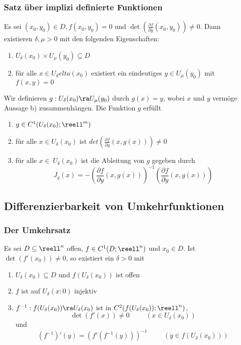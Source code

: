 \documentclass{kit}
\begin{document}
    \subsubsection{Satz über implizi definierte Funktionen}
      Es sei $(x_0,y_0)\in D,f(x_0,y_0)=0$ und $\det(\frac{\partial f}{\partial y}(x_0,y_0))\neq0$. Dann existieren 
      $\delta,\mu>0$ mit den folgenden Eigenschaften:
      \begin{enumerate}
        \item $U_\delta(x_0)\times U_\mu(y_0)\subseteq D$
        \item für alle $x\in U_delta(x_0)$ existiert ein eindeutiges $y\in U_\mu(y_0)$ mit $f(x,y)=0$
      \end{enumerate}
      Wir definieren $g:U_\delta(x_0)\ra U_\mu(y_0)$ durch $g(x)=y$, wobei $x$ und $y$ vermöge Aussage b) zusammenhängen.
      Die Funktion $g$ erfüllt
      \begin{enumerate}
        \item $g\in C^1(U_\delta(x_0);\reell^m)$
        \item für alle $x\in U_\delta(x_0)$ ist $det(\frac{\partial f}{\partial y}(x,g(x)))\neq0$
        \item für alle $x\in\ U_\delta(x_0)$ ist die Ableitung von $g$ gegeben durch
          $$J_g(x)=-\left(\frac{\partial f}{\partial y}(x,g(x))\right)^{-1}
          \left(\frac{\partial f}{\partial y}(x,g(x))\right)$$
      \end{enumerate}
  \subsection{Differenzierbarkeit von Umkehrfunktionen}
    \subsubsection{Der Umkehrsatz}
      Es sei $D\subseteq\reell^n$ offen, $f\in C^1(D;\reell^n)$ und $x_0\in D$. Ist $\det(f'(x_0))\neq0$, so existiert
      ein $\delta>0$ mit
      \begin{enumerate}
        \item $U_\delta(x_0)\subseteq D$ und $f(U_\delta(x_0))$ ist offen
        \item $f$ ist auf $U_\delta(x:0)$ injektiv
        \item $f^{-1}:f(U_\delta(x_0))\ra U_\delta(x_0)$ ist in $C^2(f(U_\delta(x_0));\reell^n)$,
          $$\det(f'(x))\neq0\hspace{1cm}(x\in U_\delta(x_0))$$
          und
          $$(f^{-1})'(y)=(f'(f^{-1}(y)))^{-1}\hspace{1cm}(y\in f(U_\delta(x_0)))$$
      \end{enumerate}
\end{document}
